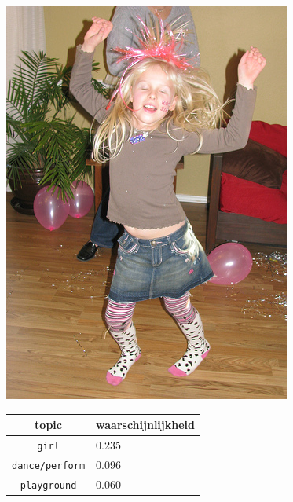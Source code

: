 \begin{figure}[h]
    \centering
    \begin{minipage}[t]{.5\linewidth}
    \centering
    \vspace{0pt}
    \includegraphics[width=\textwidth]{Images/LDA/2282260240.jpg}
    \end{minipage}\hfill
    \begin{minipage}[t]{.5\textwidth}
    \centering
    \vspace{0pt}
    \begin{tabular}{cl}
            topic                           & waarschijnlijkheid\\
            \hline
            \texttt{girl}             & 0.235 \\
            \texttt{dance/perform}                   & 0.096 \\
            \texttt{playground}                 & 0.060 \\

\end{tabular}
\end{minipage}
\end{figure}
